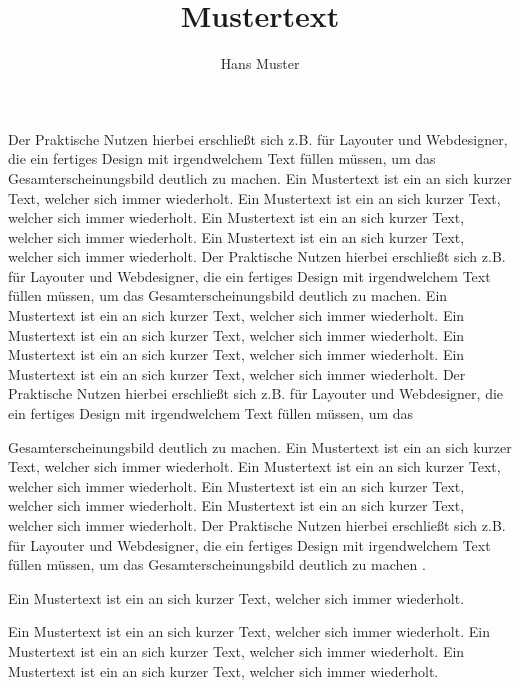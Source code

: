\documentclass{article}
\title{Mustertext}
\author{Hans Muster}
\begin{document}
\maketitle

Der Praktische Nutzen hierbei erschließt sich z.B. für Layouter und Webdesigner, die ein fertiges Design mit irgendwelchem Text füllen müssen, um das Gesamterscheinungsbild deutlich zu machen. Ein Mustertext ist ein an sich kurzer Text, welcher sich immer wiederholt. Ein Mustertext ist ein an sich kurzer Text, welcher sich immer wiederholt. Ein
Mustertext ist ein an sich kurzer Text, welcher sich immer wiederholt. Ein Mustertext ist ein an sich kurzer Text, welcher sich immer wiederholt. Der Praktische Nutzen hierbei erschließt sich z.B. für Layouter und Webdesigner, die ein fertiges Design mit irgendwelchem Text füllen müssen, um das Gesamterscheinungsbild deutlich zu machen. Ein Mustertext ist ein an sich kurzer Text, welcher sich immer wiederholt. Ein Mustertext ist ein an sich kurzer Text, welcher sich immer wiederholt. Ein Mustertext ist ein an sich kurzer Text, welcher sich immer wiederholt. Ein Mustertext ist ein an sich kurzer Text, welcher sich immer wiederholt. Der Praktische Nutzen hierbei erschließt sich z.B. für Layouter und Webdesigner, die ein fertiges Design mit irgendwelchem Text füllen müssen, um das \cite{musterfrau2000}

Gesamterscheinungsbild deutlich zu machen. Ein Mustertext ist ein an sich kurzer Text, welcher sich immer wiederholt.\cite{mustermanPhD} Ein Mustertext ist ein an sich kurzer Text, welcher sich immer wiederholt. Ein Mustertext ist ein an sich kurzer Text, welcher sich immer wiederholt. Ein Mustertext ist ein an sich kurzer Text, welcher sich immer wiederholt. Der Praktische Nutzen hierbei erschließt sich z.B. für Layouter und Webdesigner, die ein fertiges Design mit irgendwelchem Text füllen müssen, um das Gesamterscheinungsbild deutlich zu machen\cite{musterman2011} .

\begin{center}
    Ein Mustertext
    ist ein an
    sich kurzer
    Text,
    welcher
	sich immer wiederholt.
\end{center}
Ein Mustertext ist ein an sich kurzer Text, welcher sich immer wiederholt. Ein Mustertext ist ein an sich kurzer Text, welcher sich immer wiederholt. Ein Mustertext ist ein an sich kurzer Text, welcher sich immer wiederholt. 
{}

\end{document}
